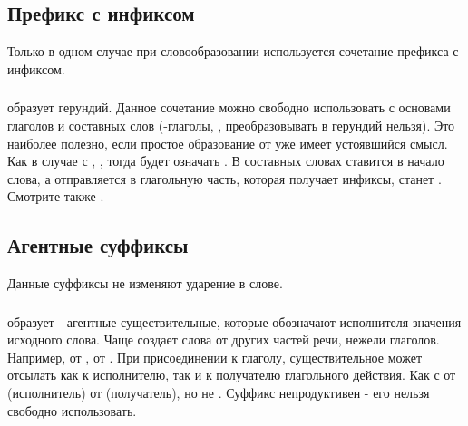 \subsection{Префикс с инфиксом} Только в одном случае при словообразовании используется сочетание префикса с инфиксом.

\subsubsection{}  образует герундий.  Данное сочетание можно свободно использовать с основами глаголов и составных слов (-глаголы,
, преобразовывать в герундий нельзя).  Это наиболее полезно,  если простое образование от  уже имеет устоявшийся смысл. Как в случае с  ,  ,
тогда  будет означать .  В составных словах  ставится в начало слова, а  отправляется в глагольную часть, которая получает инфиксы,   станет  . Смотрите также
.
\label{lingop:gerund}


\subsection{Агентные суффиксы} Данные суффиксы не изменяют ударение в слове.

\subsubsection{} 
 образует  - агентные существительные, которые обозначают исполнителя значения исходного слова. Чаще создает слова от других частей речи, нежели глаголов. Например,  
от  ,   от  .  При присоединении к глаголу, существительное может отсылать как к исполнителю, так и к получателю глагольного действия. Как с  
от   (исполнитель)  
от   (получатель), но не  .  Суффикс  непродуктивен - его нельзя свободно использовать.

